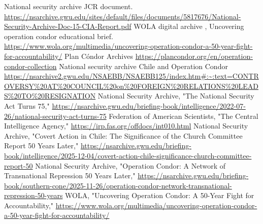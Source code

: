 
\begin{referencelist}
   National security archive JCR document. \url{https://nsarchive.gwu.edu/sites/default/files/documents/5817676/National-Security-Archive-Doc-15-CIA-Report.pdf}
   WOLA digital archive , Uncovering operation condor educational brief. \url{https://www.wola.org/multimedia/uncovering-operation-condor-a-50-year-fight-for-accountability/}
   Plan Cóndor Archives \url{https://plancondor.org/en/operation-condor-collection}
   National security archive Chile and Operation Condor \url{https://nsarchive2.gwu.edu/NSAEBB/NSAEBB125/index.htm\#:~:text=CONTROVERSY\%20AT\%20COUNCIL\%20on\%20FOREIGN\%20RELATIONS\%20LEADS\%20TO\%20RESIGNATION}
   National Security Archive, "The National Security Act Turns 75," \url{https://nsarchive.gwu.edu/briefing-book/intelligence/2022-07-26/national-security-act-turns-75}
   Federation of American Scientists, "The Central Intelligence Agency," \url{https://irp.fas.org/offdocs/int010.html}
   National Security Archive, "Covert Action in Chile: The Significance of the Church Committee Report 50 Years Later," \url{https://nsarchive.gwu.edu/briefing-book/intelligence/2025-12-04/covert-action-chile-significance-church-committee-report-50}
   National Security Archive, "Operation Condor: A Network of Transnational Repression 50 Years Later," \url{https://nsarchive.gwu.edu/briefing-book/southern-cone/2025-11-26/operation-condor-network-transnational-repression-50-years}
   WOLA, "Uncovering Operation Condor: A 50-Year Fight for Accountability," \url{https://www.wola.org/multimedia/uncovering-operation-condor-a-50-year-fight-for-accountability/}
\end{referencelist}
